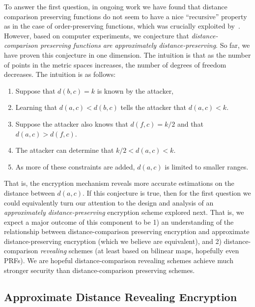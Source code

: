 To answer the first question, in ongoing work we have found that
distance comparison preserving functions do not seem to have a nice
``recursive'' property as in the case of order-preserving functions,
which was crucially exploited by~\cite{EC:BCLO09}.  However, based on
computer experiments, we conjecture that \emph{distance-comparison
preserving functions are approximately distance-preserving}.    So far,
we have proven this conjecture in one dimension.  The intuition is that
as the number of points in the metric spaces increases, the number of degrees of freedom decreases.  The intuition is as follows:
\begin{enumerate}\setlength\itemsep{0em}
\item Suppose that $d(b,c) = k$ is known by the attacker, 
\item Learning that $d(a,c) < d(b,c)$ tells the attacker that $d(a,c)<k$.  
\item Suppose the attacker also knows that $d(f, c) = k/2$ and that $d(a,c) > d(f,c)$.  
\item The attacker can determine that $k/2< d(a,c) <k$.  
\item As more of these constraints are added, $d(a,c)$ is limited to smaller ranges.
\end{enumerate}
That is, the encryption mechanism reveals more accurate estimations on  the distance between $d(a,c)$.
If this conjecture is true, then for the first question we could equivalently turn our attention to the design and analysis of  an \emph{approximately distance-preserving} encryption scheme explored next.  That is, we expect a major outcome of this component to be 1) an understanding of the relationship between distance-comparison preserving encryption and approximate distance-preserving encryption (which we believe are equivalent), and 2) distance-comparison \emph{revealing} schemes (at least based on bilinear maps, hopefully even PRFs).  We are hopeful distance-comparison revealing schemes achieve much stronger security than distance-comparison preserving schemes.

\subsection{Approximate Distance Revealing Encryption}
\label{sec:adre}
